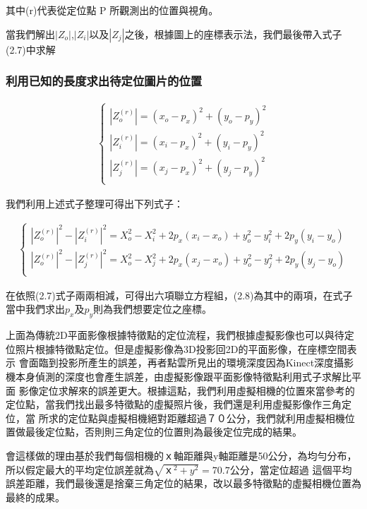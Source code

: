 	其中(r)代表從定位點 P 所觀測出的位置與視角。	
	
	當我們解出$|Z_o|$,$|Z_i|$以及$|Z_j|$之後，根據圖上的座標表示法，我們最後帶入式子(2.7)中求解
	
	\subsubsection{利用已知的長度求出待定位圖片的位置}
	
	\begin{align}
		\left\{
		\begin{array}{cccc}
		|Z_o^{(r)}| = (x_o - p_x)^2 + (y_o - p_y)^2\\
		|Z_i^{(r)}| = (x_i - p_x)^2 + (y_i - p_y)^2\\
		|Z_j^{(r)}| = (x_j - p_x)^2 + (y_j - p_y)^2\\
		\end{array}
		\right.
	\end{align}	
	
	我們利用上述式子整理可得出下列式子：
	
	\begin{align}
		\left\{
		\begin{array}{cccc}
		|Z_o^{(r)}|^2 - |Z_i^{(r)}|^2 = X_o^2 - X_i^2 + 2p_x(x_i - x_o) + y_o^2 - y_i^2 + 2p_y(y_i-y_o)\\
		|Z_o^{(r)}|^2 - |Z_j^{(r)}|^2 = X_o^2 - X_j^2 + 2p_x(x_j - x_o) + y_o^2 - y_j^2 + 2p_y(y_j-y_o)\\
		\end{array}
		\right.
	\end{align}	
	
	在依照(2.7)式子兩兩相減，可得出六項聯立方程組，(2.8)為其中的兩項，在式子當中我們求出$p_x$及$p_y$則為我們想要定位之座標。
	
    上面為傳統2D平面影像根據特徵點的定位流程，我們根據虛擬影像也可以與待定位照片根據特徵點定位。但是虛擬影像為3D投影回2D的平面影像，在座標空間表示
    會面臨到投影所產生的誤差，再者點雲所見出的環境深度因為Kinect深度攝影機本身偵測的深度也會產生誤差，由虛擬影像跟平面影像特徵點利用式子求解比平面
    影像定位求解來的誤差更大。根據這點，我們利用虛擬相機的位置來當參考的定位點，當我們找出最多特徵點的虛擬照片後，我們還是利用虛擬影像作三角定位，當
    所求的定位點與虛擬相機絕對距離超過７０公分，我們就利用虛擬相機位置做最後定位點，否則則三角定位的位置則為最後定位完成的結果。
    
    會這樣做的理由基於我們每個相機的ｘ軸距離與y軸距離是50公分，為均勻分布，所以假定最大的平均定位誤差就為$\sqrt{ｘ^2+y^2}=70.7$公分，當定位超過
    這個平均誤差距離，我們最後還是捨棄三角定位的結果，改以最多特徵點的虛擬相機位置為最終的成果。
